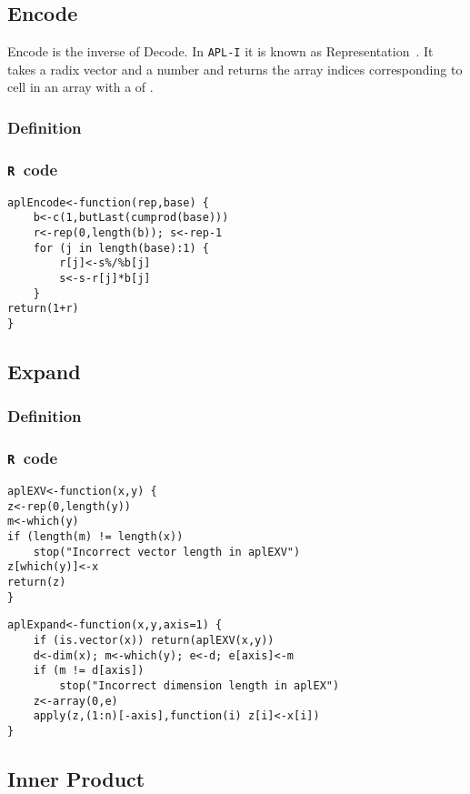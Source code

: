 \documentclass[11pt]{amsart}
\theoremstyle{plain}
\theoremstyle{definition}
\theoremstyle{remark}
\newcommand{\tR}{\texttt{R}}
\newcommand{\tAc}[1]{{\apl{#1}}}
\begin{document}
\subsection{Encode}
Encode \tAc{A\qutack B} is the inverse of Decode. In \texttt{APL-I} it is known as Representation~\citep[17--21]{helzer_89}. It takes a radix vector \tAc{A} and a number \tAc{B} and
returns the array indices corresponding to cell \tAc{B} in an array with a \tAc{\qrho} of \tAc{A}.
\subsubsection{Definition}
\subsubsection{\tR\ code}\quad
\begin{lstlisting}
aplEncode<-function(rep,base) {
    b<-c(1,butLast(cumprod(base)))
    r<-rep(0,length(b)); s<-rep-1
    for (j in length(base):1) {
        r[j]<-s%/%b[j]
        s<-s-r[j]*b[j]
    }
return(1+r)
}
\end{lstlisting}

\subsection{Expand}\quad
\subsubsection{Definition}
\subsubsection{\tR\ code}\quad
\begin{lstlisting}
aplEXV<-function(x,y) {
z<-rep(0,length(y))
m<-which(y)
if (length(m) != length(x))
    stop("Incorrect vector length in aplEXV")
z[which(y)]<-x
return(z)
}
\end{lstlisting}
\begin{lstlisting}
aplExpand<-function(x,y,axis=1) {
    if (is.vector(x)) return(aplEXV(x,y))
    d<-dim(x); m<-which(y); e<-d; e[axis]<-m
    if (m != d[axis])
        stop("Incorrect dimension length in aplEX")
    z<-array(0,e)
    apply(z,(1:n)[-axis],function(i) z[i]<-x[i])
}
\end{lstlisting}

\subsection{Inner Product}\quad
\end{document}
